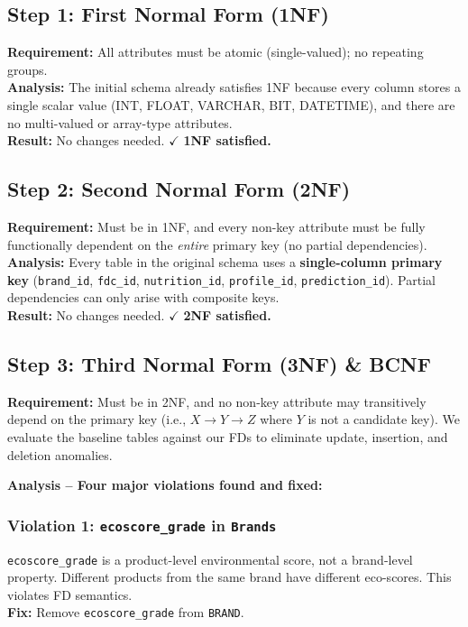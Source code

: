 \documentclass[12pt,a4paper]{article}
\begin{document}
\subsection{Step 1: First Normal Form (1NF)}
\textbf{Requirement:} All attributes must be atomic (single-valued); no repeating groups. \\
\textbf{Analysis:} The initial schema already satisfies 1NF because every column stores a single scalar value (INT, FLOAT, VARCHAR, BIT, DATETIME), and there are no multi-valued or array-type attributes. \\
\textbf{Result:} No changes needed. $\checkmark$ \textbf{1NF satisfied.}

\subsection{Step 2: Second Normal Form (2NF)}
\textbf{Requirement:} Must be in 1NF, and every non-key attribute must be fully functionally dependent on the \emph{entire} primary key (no partial dependencies). \\
\textbf{Analysis:} Every table in the original schema uses a \textbf{single-column primary key} (\texttt{brand\_id}, \texttt{fdc\_id}, \texttt{nutrition\_id}, \texttt{profile\_id}, \texttt{prediction\_id}). Partial dependencies can only arise with composite keys. \\
\textbf{Result:} No changes needed. $\checkmark$ \textbf{2NF satisfied.}

\subsection{Step 3: Third Normal Form (3NF) \& BCNF}
\textbf{Requirement:} Must be in 2NF, and no non-key attribute may transitively depend on the primary key (i.e., $X \to Y \to Z$ where $Y$ is not a candidate key). We evaluate the baseline tables against our FDs to eliminate update, insertion, and deletion anomalies.

\textbf{Analysis -- Four major violations found and fixed:}

\subsubsection*{Violation 1: \texttt{ecoscore\_grade} in \texttt{Brands}}
\texttt{ecoscore\_grade} is a product-level environmental score, not a brand-level property. Different products from the same brand have different eco-scores. This violates FD semantics. \\
\textbf{Fix:} Remove \texttt{ecoscore\_grade} from \texttt{BRAND}.
\end{document}

